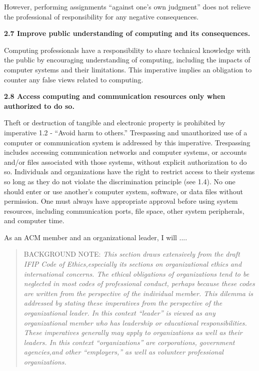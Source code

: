 However, performing assignments ``against one's own judgment'' does not relieve the professional of responsibility for any negative consequences.

\vspace{.1in}\noindent\textbf{2.7 Improve public understanding of computing and its consequences.}

Computing professionals have a responsibility to share technical knowledge with the public by encouraging understanding of computing, including the impacts of computer systems and their limitations. This imperative implies an obligation to counter any false views related to computing.

\vspace{.1in}\noindent\textbf{2.8 Access computing and communication resources only when authorized to do so.}

Theft or destruction of tangible and electronic property is prohibited by imperative 1.2 - ``Avoid harm to others.'' Trespassing and unauthorized use of a computer or communication system is addressed by this imperative. Trespassing includes accessing communication networks and computer systems, or accounts and/or files associated with those systems, without explicit authorization to do so. Individuals and organizations have the right to restrict access to their systems so long as they do not violate the discrimination principle (see 1.4). No one should enter or use another's computer system, software, or data files without permission. One must always have appropriate approval before using system resources, including communication ports, file space, other system peripherals, and computer time.




\vspace{.2in}\vspace{.1in}

As an ACM member and an organizational leader, I will ....

\begin{quote}
BACKGROUND NOTE: \emph{This section draws extensively from the draft IFIP Code of Ethics,especially its sections on organizational ethics and international concerns. The ethical obligations of organizations tend to be neglected in most codes of professional conduct, perhaps because these codes are written from the perspective of the individual member. This dilemma is addressed by stating these imperatives from the perspective of the organizational leader. In this context ``leader'' is viewed as any organizational member who has leadership or educational responsibilities. These imperatives generally may apply to organizations as well as their leaders. In this context ``organizations'' are corporations, government agencies,and other ``employers,'' as well as volunteer professional organizations.}
\end{quote}


